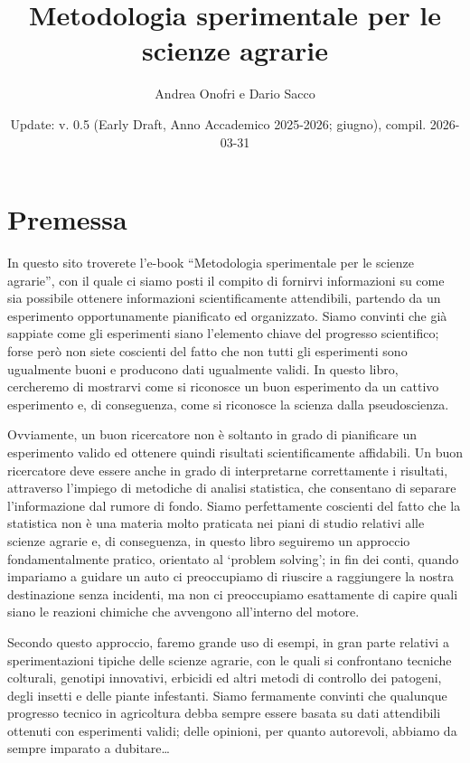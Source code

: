 \documentclass[
  12pt,
]{book}
\title{Metodologia sperimentale per le scienze agrarie}
\author{Andrea Onofri e Dario Sacco}
\date{Update: v. 0.5 (Early Draft, Anno Accademico 2025-2026; giugno), compil. 2026-03-31}
\begin{document}
\maketitle

{
\setcounter{tocdepth}{1}
\tableofcontents
}
\hypertarget{premessa}{%
\chapter*{Premessa}\label{premessa}}

In questo sito troverete l'e-book ``Metodologia sperimentale per le scienze agrarie'', con il quale ci siamo posti il compito di fornirvi informazioni su come sia possibile ottenere informazioni scientificamente attendibili, partendo da un esperimento opportunamente pianificato ed organizzato. Siamo convinti che già sappiate come gli esperimenti siano l'elemento chiave del progresso scientifico; forse però non siete coscienti del fatto che non tutti gli esperimenti sono ugualmente buoni e producono dati ugualmente validi. In questo libro, cercheremo di mostrarvi come si riconosce un buon esperimento da un cattivo esperimento e, di conseguenza, come si riconosce la scienza dalla pseudoscienza.

Ovviamente, un buon ricercatore non è soltanto in grado di pianificare un esperimento valido ed ottenere quindi risultati scientificamente affidabili. Un buon ricercatore deve essere anche in grado di interpretarne correttamente i risultati, attraverso l'impiego di metodiche di analisi statistica, che consentano di separare l'informazione dal rumore di fondo. Siamo perfettamente coscienti del fatto che la statistica non è una materia molto praticata nei piani di studio relativi alle scienze agrarie e, di conseguenza, in questo libro seguiremo un approccio fondamentalmente pratico, orientato al `problem solving'; in fin dei conti, quando impariamo a guidare un auto ci preoccupiamo di riuscire a raggiungere la nostra destinazione senza incidenti, ma non ci preoccupiamo esattamente di capire quali siano le reazioni chimiche che avvengono all'interno del motore.

Secondo questo approccio, faremo grande uso di esempi, in gran parte relativi a sperimentazioni tipiche delle scienze agrarie, con le quali si confrontano tecniche colturali, genotipi innovativi, erbicidi ed altri metodi di controllo dei patogeni, degli insetti e delle piante infestanti. Siamo fermamente convinti che qualunque progresso tecnico in agricoltura debba sempre essere basata su dati attendibili ottenuti con esperimenti validi; delle opinioni, per quanto autorevoli, abbiamo da sempre imparato a dubitare\ldots{}
\end{document}
